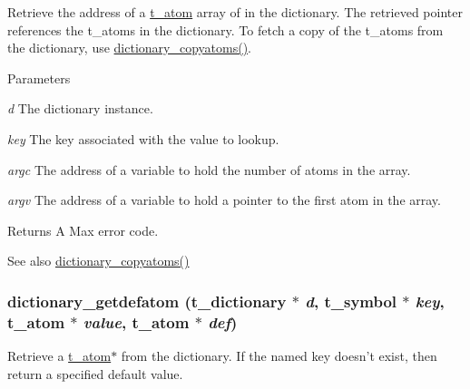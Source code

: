 Retrieve the address of a \hyperlink{structt__atom}{t\_\-atom} array of in the dictionary. The retrieved pointer references the t\_\-atoms in the dictionary. To fetch a copy of the t\_\-atoms from the dictionary, use \hyperlink{group__dictionary_ga15aff654a0d97b363e7676ff7e9709fd}{dictionary\_\-copyatoms()}.


\begin{DoxyParams}{Parameters}
\item[{\em d}]The dictionary instance. \item[{\em key}]The key associated with the value to lookup. \item[{\em argc}]The address of a variable to hold the number of atoms in the array. \item[{\em argv}]The address of a variable to hold a pointer to the first atom in the array. \end{DoxyParams}
\begin{DoxyReturn}{Returns}
A Max error code.
\end{DoxyReturn}
\begin{DoxySeeAlso}{See also}
\hyperlink{group__dictionary_ga15aff654a0d97b363e7676ff7e9709fd}{dictionary\_\-copyatoms()} 
\end{DoxySeeAlso}
\hypertarget{group__dictionary_gaa447fe7ad80586bee323e1c2bf80bdf9}{
\subsubsection[{dictionary\_\-getdefatom}]{ dictionary\_\-getdefatom ({\bf t\_\-dictionary} $\ast$ {\em d}, \/  {\bf t\_\-symbol} $\ast$ {\em key}, \/  {\bf t\_\-atom} $\ast$ {\em value}, \/  {\bf t\_\-atom} $\ast$ {\em def})}}
\label{group__dictionary_gaa447fe7ad80586bee323e1c2bf80bdf9}


Retrieve a \hyperlink{structt__atom}{t\_\-atom}$\ast$ from the dictionary. If the named key doesn't exist, then return a specified default value.


